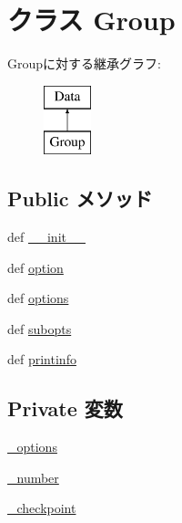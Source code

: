 \hypertarget{classm5_1_1util_1_1jobfile_1_1Group}{
\section{クラス Group}
\label{classm5_1_1util_1_1jobfile_1_1Group}
}
Groupに対する継承グラフ:\begin{figure}[H]
\begin{center}
\leavevmode
\includegraphics[height=2cm]{classm5_1_1util_1_1jobfile_1_1Group}
\end{center}
\end{figure}
\subsection*{Public メソッド}
\begin{DoxyCompactItemize}
\item 
def \hyperlink{classm5_1_1util_1_1jobfile_1_1Group_ac775ee34451fdfa742b318538164070e}{\_\-\_\-init\_\-\_\-}
\item 
def \hyperlink{classm5_1_1util_1_1jobfile_1_1Group_af4a909ae5c47fd431ab95fcac39fb2f6}{option}
\item 
def \hyperlink{classm5_1_1util_1_1jobfile_1_1Group_a9eba36f181fad41a708f8b7658b2b173}{options}
\item 
def \hyperlink{classm5_1_1util_1_1jobfile_1_1Group_a5f5171e812f65a70d0876081203f320f}{subopts}
\item 
def \hyperlink{classm5_1_1util_1_1jobfile_1_1Group_a40bc1aa85be1c4ba18cd144234c53984}{printinfo}
\end{DoxyCompactItemize}
\subsection*{Private 変数}
\begin{DoxyCompactItemize}
\item 
\hyperlink{classm5_1_1util_1_1jobfile_1_1Group_a7f9a85e66fca8983938e3ef12b102552}{\_\-options}
\item 
\hyperlink{classm5_1_1util_1_1jobfile_1_1Group_a323644ffc835b0fba1e3e75e7ee48903}{\_\-number}
\item 
\hyperlink{classm5_1_1util_1_1jobfile_1_1Group_a3c6a36161a314474d5a6e96f5976ac11}{\_\-checkpoint}
\end{DoxyCompactItemize}


